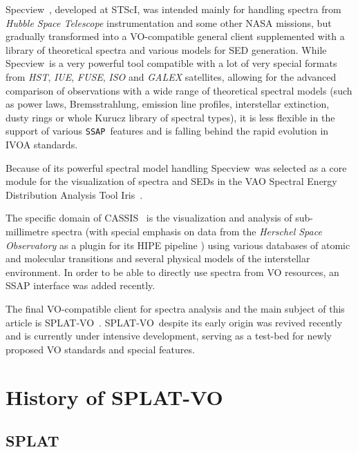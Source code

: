 \documentclass[final,authoryear,5p,times,twocolumn]{elsarticle}
\newcommand{\ssap}{\texttt{SSAP}}
\newcommand{\splatvo}{{\textsf{\small{SPLAT-VO}}}}
\newcommand{\specview}{\textsf{\small Specview}}
\newcommand{\iris}{\textsf{\small Iris}}
\newcommand{\cassis}{\textsf{\small CASSIS}}
\newcommand{\ascl}[1]{\href{http://www.ascl.net/#1}{ascl:#1}}
\begin{document}
\specview\ \citep[][\ascl{1210.016}]{2002SPIE.4847..410B}, developed at STScI,
was intended mainly for handling spectra from \emph{Hubble Space Telescope}
instrumentation and some other NASA missions, but gradually transformed into a
VO-compatible general client supplemented with a library of theoretical spectra
and various models for SED generation.  While \specview\ is a very powerful
tool compatible with a lot of very special formats from \emph{HST}, \emph{IUE},
\emph{FUSE}, \emph{ISO} and \emph{GALEX} satellites, allowing for the advanced
comparison of observations with a wide range of theoretical spectral models
(such as power laws, Bremsstrahlung, emission line profiles, interstellar
extinction, dusty rings or whole Kurucz library of spectral types), it is less
flexible in the support of various \ssap\ features and is falling behind the
rapid evolution in IVOA standards.

Because of its powerful spectral model handling \specview\   was  selected as a
core module for the visualization of spectra and SEDs in the VAO Spectral
Energy Distribution Analysis Tool \iris\
\citep[][\ascl{1205.007}]{2014ASPC..485...19L}.

The specific domain of \cassis\ \citep[][\ascl{1402.013}]{2011IAUS..280P.120C}
is the visualization and analysis of  sub-millimetre  spectra (with special
emphasis on data from the \emph{Herschel Space Observatory} as a plugin for its
HIPE pipeline \citep[][\ascl{1111.001}]{2012ASPC..461..733B}) using various
databases of atomic and molecular transitions and several physical models of
the interstellar environment. In order to be able to directly use spectra from
VO resources, an SSAP interface was added recently. 

The final VO-compatible client for spectra analysis and the main subject of
this article is \splatvo\ \citep[][\ascl{1402.008}]{sun243}.  \splatvo\ despite
its early origin was revived recently and is currently under intensive
development, serving as a test-bed for newly proposed VO standards and special
features.

\section{History of SPLAT-VO}

\subsection{SPLAT}
\end{document}
